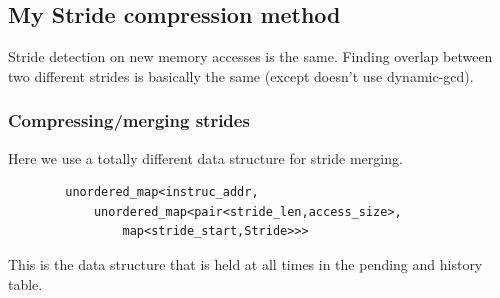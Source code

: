 \documentclass[12pt,twoside]{reedthesis}
\begin{document}







		\subsection{My Stride compression method}

		Stride detection on new memory accesses is the same. Finding overlap between two different strides is basically the same (except doesn't use dynamic-gcd).

		\subsubsection{Compressing/merging strides}

		Here we use a totally different data structure for stride merging.
		\begin{verbatim}
		unordered_map<instruc_addr,
		    unordered_map<pair<stride_len,access_size>,
		        map<stride_start,Stride>>>
		\end{verbatim}
		This is the data structure that is held at all times in the pending and history table.
\end{document}
